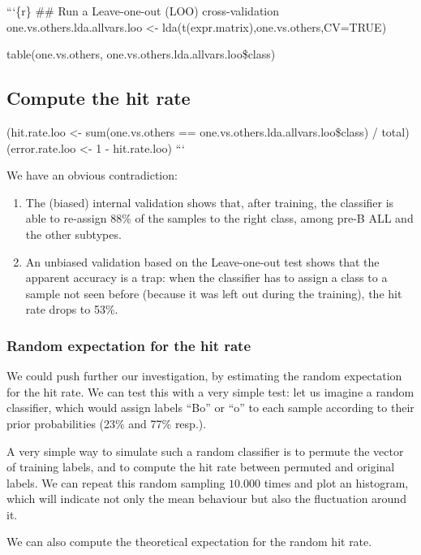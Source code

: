 ```\{r\} \#\# Run a Leave-one-out (LOO) cross-validation
one.vs.others.lda.allvars.loo \textless{}-
lda(t(expr.matrix),one.vs.others,CV=TRUE)

table(one.vs.others, one.vs.others.lda.allvars.loo\$class)

\subsection{Compute the hit rate}\label{compute-the-hit-rate-1}

(hit.rate.loo \textless{}- sum(one.vs.others ==
one.vs.others.lda.allvars.loo\$class) / total) (error.rate.loo
\textless{}- 1 - hit.rate.loo) ```

We have an obvious contradiction:

\begin{enumerate}
\def\labelenumi{\arabic{enumi}.}
\item
  The (biased) internal validation shows that, after training, the
  classifier is able to re-assign 88\% of the samples to the right
  class, among pre-B ALL and the other subtypes.
\item
  An unbiased validation based on the Leave-one-out test shows that the
  apparent accuracy is a trap: when the classifier has to assign a class
  to a sample not seen before (because it was left out during the
  training), the hit rate drops to 53\%.
\end{enumerate}

\subsubsection{Random expectation for the hit
rate}\label{random-expectation-for-the-hit-rate}

We could push further our investigation, by estimating the random
expectation for the hit rate. We can test this with a very simple test:
let us imagine a random classifier, which would assign labels ``Bo'' or
``o'' to each sample according to their prior probabilities (23\% and
77\% resp.).

A very simple way to simulate such a random classifier is to permute the
vector of training labels, and to compute the hit rate between permuted
and original labels. We can repeat this random sampling $10.000$ times
and plot an histogram, which will indicate not only the mean behaviour
but also the fluctuation around it.

We can also compute the theoretical expectation for the random hit rate.

